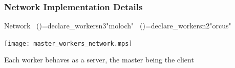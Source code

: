 \documentclass[xcolor=dvipsnames]{beamer}
\begin{document}
\begin{frame}\frametitle {Network Implementation Details}
  

\medskip\noindent
{\colorbox{tmpcolor}{\begin{minipage}{\textwidth}\ttfamily\parindent 0pt

\noindent{}\hspace*{1.22ex}Network~\linebreak
\noindent{}\hspace*{1.22ex}()\hspace*{1.22ex}=\hspace*{1.22ex}declare\_{}workers\hspace*{1.22ex}n3\hspace*{1.22ex}"moloch"~\linebreak
\noindent{}\hspace*{1.22ex}()\hspace*{1.22ex}=\hspace*{1.22ex}declare\_{}workers\hspace*{1.22ex}n2\hspace*{1.22ex}"orcus"
\end{minipage}}}


\medskip\noindent

  \begin{center}
    \texttt{[image: master\_workers\_network.mps]}
  \end{center}
  Each worker behaves as a server, the master being the client
  
\end{frame}

\end{document}
